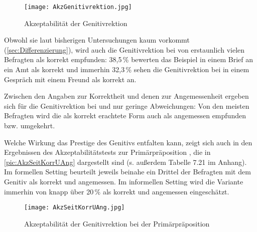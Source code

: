 \begin{figure}
\centering
\texttt{[image: AkzGenitivrektion.jpg]}
\caption{Akzeptabilität der Genitivrektion}
\label{pic:AkzGenitivrektion}
\end{figure}

Obwohl sie laut bisherigen Untersuchungen kaum vorkommt (\autoref{sec:Differenzierung}), wird auch die Genitivrektion bei \gegenueber{} von erstaunlich vielen Befragten als korrekt empfunden:  38,5\,\% bewerten  das Beispiel  in einem Brief an ein Amt als korrekt und immerhin 32,3\,\% sehen die Genitivrektion bei  in einem Gespräch mit einem Freund als korrekt an.

Zwischen den Angaben zur Korrektheit und denen zur Angemessenheit ergeben sich für die Genitivrektion bei \dank{} und \gegenueber{} nur geringe Abweichungen: 
Von den meisten Befragten wird die als korrekt erachtete Form auch als angemessen empfunden bzw. umgekehrt. 

Welche Wirkung das Prestige des Genitivs entfalten kann, zeigt sich auch in den Ergebnissen des Akzeptabilitätstests zur Primärpräposition , die in \autoref{pic:AkzSeitKorrUAng} dargestellt sind (s. außerdem Tabelle 7.21 im Anhang). 
Im formellen Setting beurteilt jeweils beinahe ein Drittel der Befragten  mit dem Genitiv als korrekt und angemessen. 
Im informellen Setting wird die Variante immerhin von knapp über 20\,\% als korrekt und angemessen eingeschätzt. 

\begin{figure}
\centering
\texttt{[image: AkzSeitKorrUAng.jpg]}
\caption{Akzeptabilität der Genitivrektion bei der Primärpräposition }
\label{pic:AkzSeitKorrUAng}
\end{figure}

